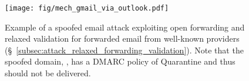 




\begin{figure}[t]
  \centerline{\texttt{[image: fig/mech\_gmail\_via\_outlook.pdf]}}
  \centering
  \caption{Example of a spoofed email attack exploiting open forwarding and relaxed validation for forwarded email from well-known providers (\S~\ref{subsec:attack_relaxed_forwarding_validation}).
    Note that the spoofed domain, , has a DMARC policy of Quarantine and thus
    should not be delivered.}
  \label{fig:mech_gmail_via_outlook}
\end{figure}



